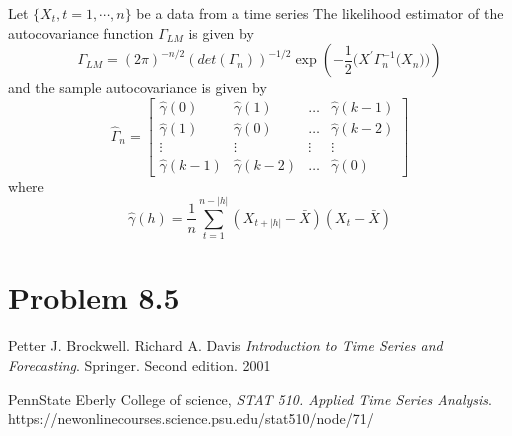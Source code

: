 \documentclass[11pt, oneside]{article}   	%
\begin{document}
Let $\{ X_{t}, t = 1, \cdots, n \}$ be a data from a time series
The likelihood estimator of the autocovariance function $\Gamma_{LM}$ is given by \cite{petter}
\begin{equation}
\Gamma_{LM} = (2\pi)^{-n/2}(det(\Gamma_{n}))^{-1/2}\exp\left(  -\frac{1}{2}\mathbb(X^{\prime}\Gamma_{n}^{-1}\mathbb(X_{n})) \right)
\end{equation}
and the sample autocovariance is given by
\begin{equation}
\hat{\Gamma}_{n} = 
\begin{bmatrix}
    \hat{\gamma}(0) & \hat{\gamma}(1)  & \dots  & \hat{\gamma}(k-1) \\
        \hat{\gamma}(1) & \hat{\gamma}(0) & \dots  & \hat{\gamma}(k-2) \\
    \vdots & \vdots & \vdots & \vdots \\
        \hat{\gamma}(k-1) & \hat{\gamma}(k-2)  & \dots  & \hat{\gamma}(0)
\end{bmatrix}
\end{equation}
where 
\begin{equation}
\hat{\gamma}(h) = \frac{1}{n}\sum_{t=1}^{n-|h|}(X_{t+|h|}-\bar{X})(X_{t}-\bar{X})
\end{equation}







\section{Problem 8.5}

\begin{thebibliography}{9}
Petter J. Brockwell. Richard A. Davis
\textit{Introduction to Time Series and Forecasting}. 
Springer. Second edition. 2001

PennState Eberly College of science, 
\textit{STAT 510. Applied Time Series Analysis}. 
https://newonlinecourses.science.psu.edu/stat510/node/71/
 
\end{thebibliography}
\end{document}
